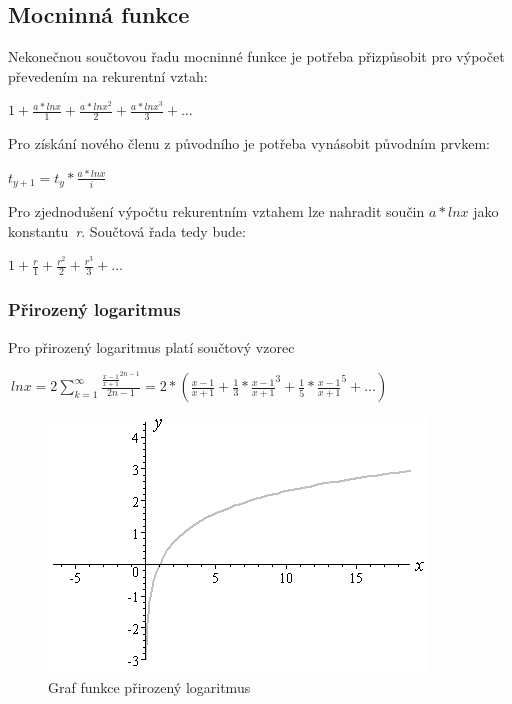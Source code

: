 \documentclass[12pt,a4paper,titlepage,final]{article}
\begin{document}
\subsection{Mocninná funkce}\label{rozsah}

Nekonečnou součtovou řadu mocninné funkce je potřeba přizpůsobit pro výpočet 
převedením na rekurentní vztah:

\begin{center}
$ {\displaystyle 1 + \frac{a*lnx}{1} + \frac{a*lnx^{2}}{2} + 
\frac{a*lnx^{3}}{3} + \ldots}$\end{center}

Pro získání nového členu z původního je potřeba vynásobit původním prvkem:

\begin{center}
$ {\displaystyle t_{y+1} = t_{y} * \frac{a*lnx}{i}}$\end{center}

Pro zjednodušení výpočtu rekurentním vztahem lze nahradit součin $a*lnx$ 
jako konstantu~\textit{r}. Součtová řada tedy bude:

\begin{center}
$ {\displaystyle 1 + \frac{r}{1} + \frac{r^{2}}{2} + 
\frac{r^{3}}{3}+ \ldots}$\end{center}


\subsubsection{Přirozený logaritmus}

Pro přirozený logaritmus platí součtový vzorec 
\begin{center}
$ {\displaystyle\ lnx = 2 \sum_{k=1}^{\infty} 
\frac{\frac{x-1}{x+1}^{2n-1}}{2n-1} 
= 2 * (\frac{x-1}{x+1} + \frac{1}{3}*\frac{x-1}{x+1}^{3} + 
\frac{1}{5}*\frac{x-1}{x+1}^{5} + \ldots ) }$\end{center}

\begin{figure}[htbp]
  \centering
  \includegraphics[height=6.cm]{img/ln.png}
  \caption{Graf funkce přirozený logaritmus}
  \label{fig:ln}
\end{figure}
\end{document}
